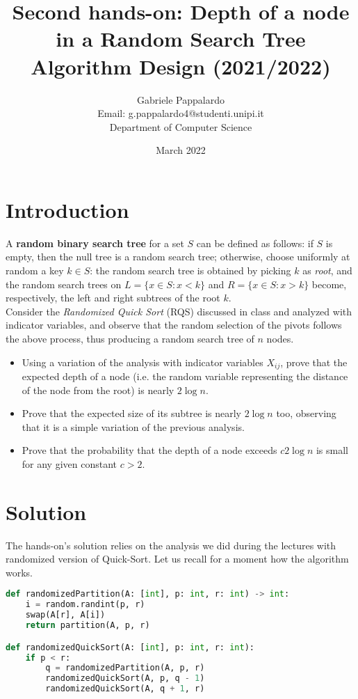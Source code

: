 \documentclass{article}
\title{Second hands-on: Depth of a node in a Random Search Tree\\[1ex] \large Algorithm Design (2021/2022)}
\author{Gabriele Pappalardo\\Email: g.pappalardo4@studenti.unipi.it\\Department of Computer Science}
\date{March 2022}
\begin{document}
\maketitle

\section{Introduction}

A \textbf{random binary search tree} for a set $S$ can be defined as follows: if $S$ is empty, then the null tree is a random search tree; otherwise, choose uniformly at random a key $k \in S$: the random search tree is obtained by picking $k$ as \textit{root}, and the random search trees on $L = \{x \in S : x < k\}$ and $R = \{x \in S : x > k\}$ become, respectively, the left and right subtrees of the root $k$.\\

\noindent Consider the \textit{Randomized Quick Sort} (RQS) discussed in class and analyzed with indicator variables, and observe that the random selection of the pivots follows the above process, thus producing a random search tree of $n$ nodes.

\begin{itemize}
    \item Using a variation of the analysis with indicator variables $X_{ij}$, prove that the expected depth of a node (i.e. the random variable representing the distance of the node from the root) is nearly $2 \log n$. 
    \item Prove that the expected size of its subtree is nearly $2 \log n$ too, observing that it is a simple variation of the previous analysis.
    \item Prove that the probability that the depth of a node exceeds $c2 \log n$ is small for any given constant $c > 2$. 
\end{itemize}

\section{Solution}

The hands-on's solution relies on the analysis we did during the lectures with randomized version of Quick-Sort.
Let us recall for a moment how the algorithm works.

\begin{lstlisting}[language=Python,caption=`Randomized QuickSort']
def randomizedPartition(A: [int], p: int, r: int) -> int:
    i = random.randint(p, r)
    swap(A[r], A[i])
    return partition(A, p, r)

def randomizedQuickSort(A: [int], p: int, r: int):
    if p < r:
        q = randomizedPartition(A, p, r)
        randomizedQuickSort(A, p, q - 1)
        randomizedQuickSort(A, q + 1, r)
\end{lstlisting}
\end{document}
